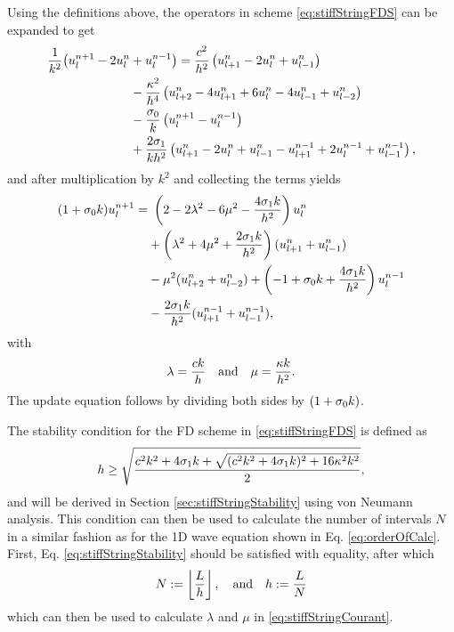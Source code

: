 Using the definitions above, 
the operators in scheme \eqref{eq:stiffStringFDS} can be expanded to get
\begin{equation}
    \begin{aligned}\label{eq:expandedStringFDS}
        \frac{1}{k^2}\big(u_l^{n+1} - 2u_l^n & + u_l^{n-1} \big) =\frac{c^2}{h^2}\left(u_{l+1}^n - 2u_l^n + u_{l-1}^n\right) \\
        &- \frac{\kappa^2}{h^4}\left(u_{l+2}^n - 4u_{l+1}^n+6u_l^n - 4u_{l-1}^n+u_{l-2}^n\right) \\ 
        &- \frac{\sigma_{0}}{k} \left(u_l^{n+1} - u_l^{n-1}\right)\\
        & + \frac{2\sigma_{1}}{kh^2}\left(u_{l+1}^n - 2u_l^n + u_{l-1}^n - u_{l+1}^{n-1} + 2u_l^{n-1} + u_{l-1}^{n-1}\right),
    \end{aligned}
\end{equation}
and after multiplication by $k^2$ and collecting the terms yields
\begin{equation}\label{eq:stiffStringUpdate}
    \begin{aligned}
        (1+\sigma_{0} k) u_l^{n+1} =&\ \left(2 - 2\lambda^2 - 6\mu^2 - \frac{4\sigma_{1} k}{h^2}\right) u_l^n\\
        & + \left(\lambda^2 + 4\mu^2 + \frac{2\sigma_{1} k}{h^2}\right) (u_{l+1}^n + u_{l-1}^n) \\
        &- \mu^2 (u_{l+2}^n + u_{l-2}^n) + \left(-1+\sigma_{0} k + \frac{4\sigma_{1} k}{h^2}\right)u_l^{n-1}\\
        & - \frac{2\sigma_{1} k}{h^2}(u_{l+1}^{n-1} + u_{l-1}^{n-1}),
    \end{aligned}
\end{equation}
with 
\begin{equation}\label{eq:stiffStringCourant}
    \lambda = \frac{ck}{h} \quad \text{and} \quad \mu = \frac{\kappa k}{h^2}.
\end{equation}
The update equation follows by dividing both sides by $(1+\sigma_{0} k)$. 

The stability condition for the FD scheme in \eqref{eq:stiffStringFDS} is defined as 
\begin{equation}\label{eq:stiffStringStability}
    h \geq \sqrt{\frac{c^2k^2+4\sigma_{1} k + \sqrt{(c^2k^2 + 4\sigma_{1} k)^2+16\kappa^2k^2}}{2}},
\end{equation}
and will be derived in Section \ref{sec:stiffStringStability} using von Neumann analysis. 
This condition can then be used to calculate the number of intervals $N$ in a similar fashion as for the 1D wave equation shown in Eq. \eqref{eq:orderOfCalc}. First, Eq. \eqref{eq:stiffStringStability} should be satisfied with equality, after which
\begin{equation*}
    N := \floor[\frac{L}{h}], \qaq h := \frac{L}{N}
\end{equation*}
which can then be used to calculate $\lambda$ and $\mu$ in \eqref{eq:stiffStringCourant}.


